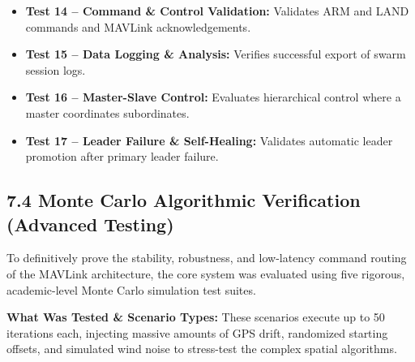 \documentclass[11pt,a4paper]{article}
\begin{document}
\begin{itemize}[leftmargin=1.5em]
    \item \textbf{Test 14 -- Command \& Control Validation:} Validates ARM and LAND commands and MAVLink acknowledgements.
    \item \textbf{Test 15 -- Data Logging \& Analysis:} Verifies successful export of swarm session logs.
    \item \textbf{Test 16 -- Master-Slave Control:} Evaluates hierarchical control where a master coordinates subordinates.
    \item \textbf{Test 17 -- Leader Failure \& Self-Healing:} Validates automatic leader promotion after primary leader failure.
\end{itemize}

\subsection{7.4 Monte Carlo Algorithmic Verification (Advanced Testing)}
To definitively prove the stability, robustness, and low-latency command routing of the MAVLink architecture, the core system was evaluated using five rigorous, academic-level Monte Carlo simulation test suites. 

\textbf{What Was Tested \& Scenario Types:}
These scenarios execute up to 50 iterations each, injecting massive amounts of GPS drift, randomized starting offsets, and simulated wind noise to stress-test the complex spatial algorithms. 
\end{document}
